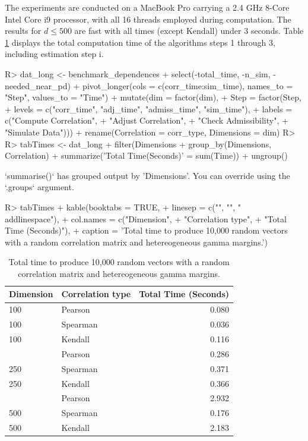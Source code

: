 \documentclass[
]{jss}
\begin{document}
The experiments are conducted on a MacBook Pro carrying a 2.4 GHz 8-Core Intel Core i9 processor, with all 16 threads employed during computation. The results for \(d \leq 500\) are fast with all times (except Kendall) under 3 seconds. Table \ref{tab:ch040-moderateDtab} displays the total computation time of the algorithms steps 1 through 3, including estimation step i.

\begin{CodeChunk}
\begin{CodeInput}
R> dat_long <- benchmark_dependences %
+   select(-total_time, -n_sim, -needed_near_pd) %
+   pivot_longer(cols = c(corr_time:sim_time), names_to = "Step", values_to = "Time") %
+   mutate(dim = factor(dim),
+          Step = factor(Step,
+                        levels = c("corr_time", "adj_time", "admiss_time", "sim_time"),
+                        labels = c("Compute Correlation",
+                                   "Adjust Correlation",
+                                   "Check Admissibility",
+                                   "Simulate Data"))) %
+     rename(Correlation = corr_type, Dimensions = dim)
R> 
R> tabTimes  <- dat_long %
+     filter(Dimensions %
+     group_by(Dimensions, Correlation) %
+     summarize('Total Time(Seconds)' = sum(Time)) %
+     ungroup()
\end{CodeInput}
\begin{CodeOutput}
`summarise()` has grouped output by 'Dimensions'. You can override using the `.groups` argument.
\end{CodeOutput}
\begin{CodeInput}
R> tabTimes %
+     kable(booktabs = TRUE,
+           linesep = c("", "", "\\addlinespace"),
+           col.names = c("Dimension",
+                         "Correlation type",
+                         "Total Time (Seconds)"),
+           caption = 'Total time to produce 10,000 random vectors with a random correlation matrix and hetereogeneous gamma margins.')
\end{CodeInput}
\begin{table}

\caption{\label{tab:ch040-moderateDtab}Total time to produce 10,000 random vectors with a random correlation matrix and hetereogeneous gamma margins.}
\centering
\begin{tabular}[t]{llr}
\toprule
Dimension & Correlation type & Total Time (Seconds)\\
\midrule
100 & Pearson & 0.080\\
100 & Spearman & 0.036\\
100 & Kendall & 0.116\\
\addlinespace
250 & Pearson & 0.286\\
250 & Spearman & 0.371\\
250 & Kendall & 0.366\\
\addlinespace
500 & Pearson & 2.932\\
500 & Spearman & 0.176\\
500 & Kendall & 2.183\\
\bottomrule
\end{tabular}
\end{table}


\end{CodeChunk}
\end{document}
